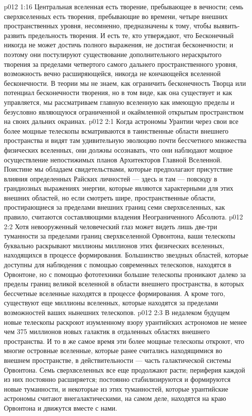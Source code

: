 \vs p012 1:16 Центральная вселенная есть творение, пребывающее в вечности; семь сверхвселенных есть творения, пребывающие во времени, четыре внешних пространственных уровня, несомненно, предназначены к тому, чтобы выявить\hyp{}развить предельность творения. И есть те, кто утверждают, что Бесконечный никогда не может достичь полного выражения, не достигая бесконечности; и поэтому они постулируют существование дополнительного нераскрытого творения за пределами четвертого самого дальнего пространственного уровня, возможность вечно расширяющейся, никогда не кончающейся вселенной бесконечности. В теории мы не знаем, как ограничить бесконечность Творца или потенциал бесконечности творения, но в том виде, как она существует и как управляется, мы рассматриваем главную вселенную как имеющую пределы и безусловно являющуюся ограниченной и окаймленной открытым пространством на своих дальних окраинах.
\vs p012 2:1 Когда астрономы Урантии через свои все более мощные телескопы всматриваются в таинственные области внешнего пространства и видят там удивительную эволюцию почти бессчетного множества физических вселенных, они должны осознавать, что они наблюдают мощное осуществление непостижимых планов Архитекторов Главной Вселенной. Поистине мы обладаем свидетельствами, которые предполагают присутствие влияния определенных Райских личностей --- здесь и там --- повсюду в грандиозных выражениях энергии, которые являются характерными для этих внешних областей, но если смотреть шире, пространственные области, простирающиеся за пределами внешних границ семи сверхвселенных, как правило, считаются составляющими владения Неограниченного Абсолюта.
\vs p012 2:2 Хотя невооруженный человеческий глаз может видеть лишь две\hyp{}три туманности за пределами границ сверхвселенной Орвонтона, ваши телескопы буквально раскрывают миллионы миллионов этих физических вселенных, находящихся в процессе формирования. Большинство звездных областей, которые доступны для наблюдения с помощью современных телескопов, находятся в Орвонтоне, но с помощью фототехники большие телескопы проникают далеко за пределы границ великой вселенной в области внешнего пространства, в которых бессчетные вселенные находятся в процессе формирования. А кроме того, существуют еще миллионы вселенных, которые находятся за пределами возможностей ваших нынешних телескопов.
\vs p012 2:3 В недалеком будущем новые телескопы раскроют изумленному взору урантийских астрономов не менее чем 375 миллионов новых галактик в отдаленных областях внешнего пространства. И то в же самое время эти более мощные телескопы откроют, что многие островные вселенные, которые ранее считались находящимися во внешнем пространстве, в действительности --- часть галактической системы Орвонтона. Семь сверхвселенных все еще продолжают расти; периферия каждой из них постоянно расширяется; постоянно стабилизируются и формируются новые туманности, и некоторые из этих туманностей, которые урантийские астрономы считают внегалактическими, на самом деле, находятся на краю Орвонтона и движутся вместе с нами.
